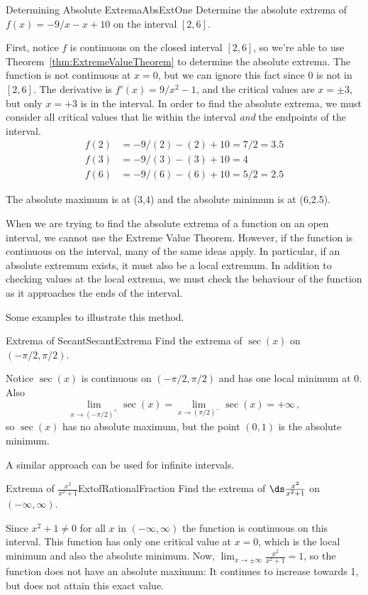 \begin{example}{Determining Absolute Extrema}{AbsExtOne}
	Determine the absolute extrema of $f(x)=-9/x-x+10$ on the interval $[2,6]$.
\end{example}
\begin{solution}
	First, notice $f$ is continuous on the closed interval $[2,6]$,
	so we're able to use Theorem~\ref{thm:ExtremeValueTheorem} to 
	determine the absolute extrema. The function is not continuous
	at $x=0$, but we can ignore this fact since 0 is not in $[2,6]$.
	The derivative is $f'(x)=9/x^2-1$, and the critical values are
	$x=\pm 3$, but only $x=+3$ is in the interval. In order to find
	the absolute extrema, we must consider all critical values that
	lie within the interval \emph{and} the endpoints of the interval.
	\begin{align*}
		f(2)&=-9/(2)-(2)+10=7/2=3.5	\\
		f(3)&=-9/(3)-(3)+10=4	\\
		f(6)&=-9/(6)-(6)+10=5/2=2.5
	\end{align*}
	
	The absolute maximum is at (3,4) and the absolute minimum is at (6,2.5).
\end{solution}

When we are trying to find the absolute extrema of a function on an
open interval, we cannot use the Extreme Value Theorem. However, if
the function is continuous on the interval, many of the same ideas apply.
In particular, if an absolute extremum exists, it must also be a local extremum.
In addition to checking values at the local extrema, we must check the behaviour
of the function as it approaches the ends of the interval.

Some examples to illustrate this method.

\begin{example}{Extrema of Secant}{SecantExtrema}
	Find the extrema of $\sec(x)$ on $(-\pi/2,\pi/2)$.
\end{example}
\begin{solution}
	Notice $\sec(x)$ is continuous on $(-\pi/2,\pi/2)$ and has one local minimum at 0. Also
	\[\lim_{x\to(-\pi/2)^+}\sec(x)=\lim_{x\to(\pi/2)^-}\sec(x)=+\infty\, ,\]
	so $\sec(x)$ has no absolute maximum, but the point $(0,1)$ is the absolute minimum.
\end{solution}

A similar approach can be used for infinite intervals.

\begin{example}{Extrema of $\frac{x^2}{x^2+1}$}{ExtofRationalFraction}
	Find the extrema of $\ds\frac{x^2}{x^2+1}$ on $(-\infty,\infty)$.
\end{example}
\begin{solution}
	Since $x^2+1\neq 0$ for all $x$ in $(-\infty,\infty)$ the function is continuous on this interval. This function has only one critical value at $x=0$, which is the local minimum and also the absolute minimum. Now, $\lim_{x\to\pm\infty}\frac{x^2}{x^2+1}=1$, so the function does not have an absolute maximum: It continues to increase towards 1, but does not attain this exact value. 
\end{solution}


